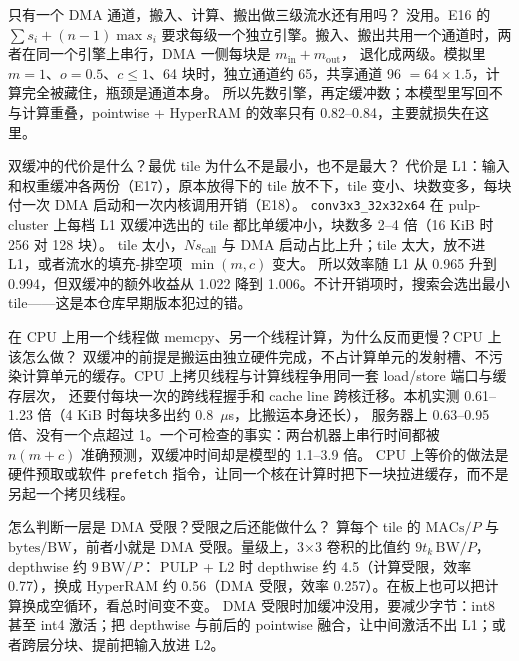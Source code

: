 \documentclass[11pt,a4paper]{ctexart}
\begin{document}
\begin{iqbox}{只有一个 DMA 通道，搬入、计算、搬出做三级流水还有用吗？}
没用。E16 的 $\sum s_i + (n-1)\max s_i$ 要求每级一个独立引擎。搬入、搬出共用一个通道时，两者在同一个引擎上串行，DMA 一侧每块是 $m_{\text{in}}+m_{\text{out}}$，
退化成两级。模拟里 $m=1$、$o=0.5$、$c\le1$、64 块时，独立通道约 65，共享通道 96 $=64\times1.5$，计算完全被藏住，瓶颈是通道本身。
所以先数引擎，再定缓冲数；本模型里写回不与计算重叠，pointwise + HyperRAM 的效率只有 0.82--0.84，主要就损失在这里。
\end{iqbox}

\begin{iqbox}{双缓冲的代价是什么？最优 tile 为什么不是最小，也不是最大？}
代价是 L1：输入和权重缓冲各两份（E17），原本放得下的 tile 放不下，tile 变小、块数变多，每块付一次 DMA 启动和一次内核调用开销（E18）。
\texttt{conv3x3\_32x32x64} 在 pulp-cluster 上每档 L1 双缓冲选出的 tile 都比单缓冲小，块数多 2--4 倍（16 KiB 时 256 对 128 块）。
tile 太小，$N s_{\text{call}}$ 与 DMA 启动占比上升；tile 太大，放不进 L1，或者流水的填充-排空项 $\min(m,c)$ 变大。
所以效率随 L1 从 0.965 升到 0.994，但双缓冲的额外收益从 1.022 降到 1.006。不计开销项时，搜索会选出最小 tile——这是本仓库早期版本犯过的错。
\end{iqbox}

\begin{iqbox}{在 CPU 上用一个线程做 memcpy、另一个线程计算，为什么反而更慢？CPU 上该怎么做？}
双缓冲的前提是搬运由独立硬件完成，不占计算单元的发射槽、不污染计算单元的缓存。CPU 上拷贝线程与计算线程争用同一套 load/store 端口与缓存层次，
还要付每块一次的跨线程握手和 cache line 跨核迁移。本机实测 0.61--1.23 倍（4 KiB 时每块多出约 0.8~$\mu$s，比搬运本身还长），
服务器上 0.63--0.95 倍、没有一个点超过 1。一个可检查的事实：两台机器上串行时间都被 $n(m+c)$ 准确预测，双缓冲时间却是模型的 1.1--3.9 倍。
CPU 上等价的做法是硬件预取或软件 \texttt{prefetch} 指令，让同一个核在计算时把下一块拉进缓存，而不是另起一个拷贝线程。
\end{iqbox}

\begin{iqbox}{怎么判断一层是 DMA 受限？受限之后还能做什么？}
算每个 tile 的 $\text{MACs}/P$ 与 $\text{bytes}/\text{BW}$，前者小就是 DMA 受限。量级上，3×3 卷积的比值约 $9t_k\,\text{BW}/P$，depthwise 约 $9\,\text{BW}/P$：
PULP + L2 时 depthwise 约 4.5（计算受限，效率 0.77），换成 HyperRAM 约 0.56（DMA 受限，效率 0.257）。在板上也可以把计算换成空循环，看总时间变不变。
DMA 受限时加缓冲没用，要减少字节：int8 甚至 int4 激活；把 depthwise 与前后的 pointwise 融合，让中间激活不出 L1；或者跨层分块、提前把输入放进 L2。
\end{iqbox}
\end{document}
